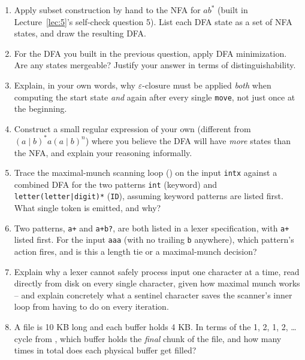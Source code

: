 \documentclass[full-course-notes.tex]{subfiles}
\begin{document}
\begin{enrichment}
\begin{enumerate}
  \item Apply subset construction by hand to the NFA for $ab^{*}$ (built in
  Lecture~\ref{lec:5}'s self-check question 5). List each DFA state as a set of NFA states, and
  draw the resulting DFA.
  \item For the DFA you built in the previous question, apply DFA minimization. Are any states
  mergeable? Justify your answer in terms of distinguishability.
  \item Explain, in your own words, why $\varepsilon\text{-closure}$ must be applied \emph{both}
  when computing the start state \emph{and} again after every single \texttt{move}, not just
  once at the beginning.
  \item Construct a small regular expression of your own (different from
  $(a\mid b)^{*}a(a\mid b)^{n}$) where you believe the DFA will have \emph{more} states than the
  NFA, and explain your reasoning informally.
  \item Trace the maximal-munch scanning loop () on the input
  \texttt{intx} against a combined DFA for the two patterns \texttt{int} (keyword) and
  \texttt{letter(letter|digit)*} (\texttt{ID}), assuming keyword patterns are listed first. What
  single token is emitted, and why?
  \item Two patterns, \texttt{a+} and \texttt{a+b?}, are both listed in a lexer specification,
  with \texttt{a+} listed first. For the input \texttt{aaa} (with no trailing \texttt{b}
  anywhere), which pattern's action fires, and is this a length tie or a maximal-munch decision?
  \item Explain why a lexer cannot safely process input one character at a time, read directly
  from disk on every single character, given how maximal munch works -- and explain concretely
  what a sentinel character saves the scanner's inner loop from having to do on every iteration.
  \item A file is 10 KB long and each buffer holds 4 KB. In terms of the 1, 2, 1, 2, \dots
  cycle from , which buffer holds the \emph{final} chunk of the
  file, and how many times in total does each physical buffer get filled?
\end{enumerate}
\end{enrichment}
\end{document}
